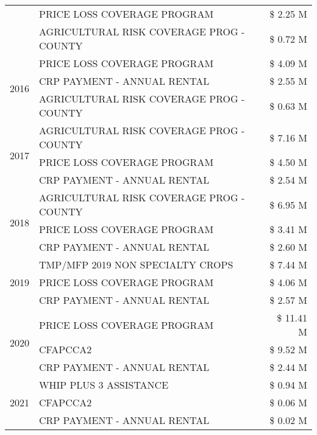 \begin{tabular}{llr}
 & PRICE LOSS COVERAGE PROGRAM & \$ 2.25 M \\
 & AGRICULTURAL RISK COVERAGE PROG - COUNTY & \$ 0.72 M \\
\cline{1-3}
\multirow[t]{3}{*}{2016} & PRICE LOSS COVERAGE PROGRAM & \$ 4.09 M \\
 & CRP PAYMENT - ANNUAL RENTAL & \$ 2.55 M \\
 & AGRICULTURAL RISK COVERAGE PROG - COUNTY & \$ 0.63 M \\
\cline{1-3}
\multirow[t]{3}{*}{2017} & AGRICULTURAL RISK COVERAGE PROG - COUNTY & \$ 7.16 M \\
 & PRICE LOSS COVERAGE PROGRAM & \$ 4.50 M \\
 & CRP PAYMENT - ANNUAL RENTAL & \$ 2.54 M \\
\cline{1-3}
\multirow[t]{3}{*}{2018} & AGRICULTURAL RISK COVERAGE PROG - COUNTY & \$ 6.95 M \\
 & PRICE LOSS COVERAGE PROGRAM & \$ 3.41 M \\
 & CRP PAYMENT - ANNUAL RENTAL & \$ 2.60 M \\
\cline{1-3}
\multirow[t]{3}{*}{2019} & TMP/MFP 2019 NON SPECIALTY CROPS & \$ 7.44 M \\
 & PRICE LOSS COVERAGE PROGRAM & \$ 4.06 M \\
 & CRP PAYMENT - ANNUAL RENTAL & \$ 2.57 M \\
\cline{1-3}
\multirow[t]{3}{*}{2020} & PRICE LOSS COVERAGE PROGRAM & \$ 11.41 M \\
 & CFAPCCA2 & \$ 9.52 M \\
 & CRP PAYMENT - ANNUAL RENTAL & \$ 2.44 M \\
\cline{1-3}
\multirow[t]{3}{*}{2021} & WHIP PLUS 3 ASSISTANCE & \$ 0.94 M \\
 & CFAPCCA2 & \$ 0.06 M \\
 & CRP PAYMENT - ANNUAL RENTAL & \$ 0.02 M \\
\cline{1-3}
\bottomrule
\end{tabular}
